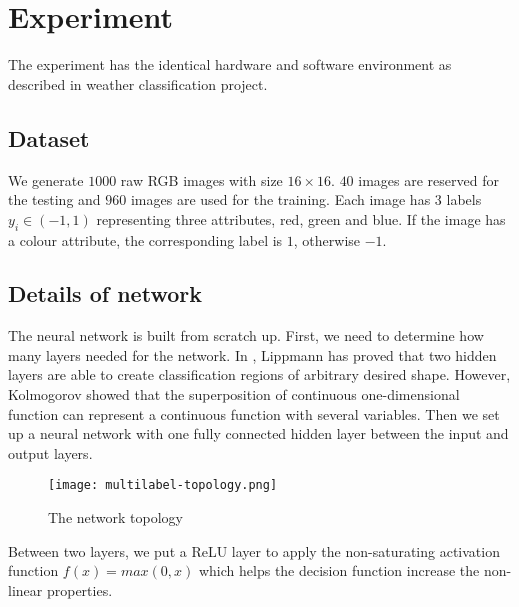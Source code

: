 
\chapter{Experiment} %
\label{Chapter8}

The experiment has the identical hardware and software environment as described in weather classification project.

\section{Dataset}

We generate $1000$ raw RGB images with size $16 \times 16$. $40$ images are reserved for the testing and $960$ images are used for the training. Each image has $3$ labels $y_i \in (-1, 1)$ representing three attributes, red, green and blue. If the image has a colour attribute, the corresponding label is $1$, otherwise $-1$.

\section{Details of network}

The neural network is built from scratch up. First, we need to determine how many layers needed for the network. In \cite{lippmann1987introduction}, Lippmann has proved that two hidden layers are able to create classification regions of arbitrary desired shape. However, Kolmogorov \citep{kolmogorov1963representation} showed that the superposition of continuous one-dimensional function can represent a continuous function with several variables. Then we set up a neural network with one fully connected hidden layer between the input and output layers.
\begin{figure}[!htb]
\centering
\texttt{[image: multilabel-topology.png]}
\caption{\label{fig:MLtopology}The network topology}
\end{figure}
Between two layers, we put a ReLU layer to apply the non-saturating activation function $f(x) = max(0,x)$ which helps the decision function increase the non-linear properties.

